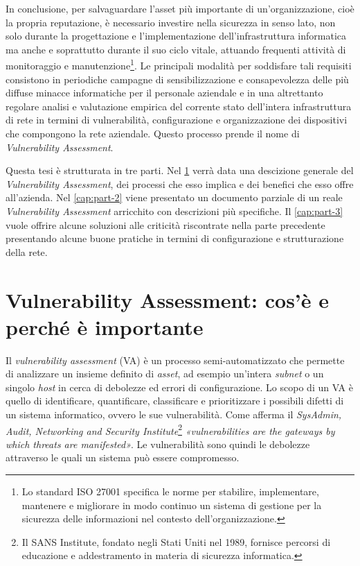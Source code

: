 \documentclass[target=bach,aauheader=]{thud}
\begin{document}
In conclusione, per salvaguardare l’asset più importante di un’organizzazione, cioè la propria reputazione, è necessario investire nella sicurezza in senso lato, non solo durante la progettazione e l’implementazione dell’infrastruttura informatica ma anche e soprattutto durante il suo ciclo vitale, attuando frequenti attività di monitoraggio e manutenzione\footnote{Lo standard ISO 27001 specifica le norme per stabilire, implementare, mantenere e migliorare in modo continuo un sistema di gestione per la sicurezza delle informazioni nel contesto dell’organizzazione.}. Le principali modalità per soddisfare tali requisiti consistono in periodiche campagne di sensibilizzazione e consapevolezza delle più diffuse minacce informatiche per il personale aziendale e in una altrettanto regolare analisi e valutazione empirica del corrente stato dell’intera infrastruttura di rete in termini di vulnerabilità, configurazione e organizzazione dei dispositivi che compongono la rete aziendale.
Questo processo prende il nome di \textit{Vulnerability Assessment}.

Questa tesi è strutturata in tre parti. Nel \cref{cap:part-1} verrà data una descizione generale del \textit{Vulnerability Assessment}, dei processi che esso implica e dei benefici che esso offre all'azienda. Nel \cref{cap:part-2} viene presentato un documento parziale di un reale \textit{Vulnerability Assessment} arricchito con descrizioni più specifiche. Il \cref{cap:part-3} vuole offrire alcune soluzioni alle criticità riscontrate nella parte precedente presentando alcune buone pratiche in termini di configurazione e strutturazione della rete.


\chapter{Vulnerability Assessment: cos’è e perché è importante} \label{cap:part-1}

Il \textit{vulnerability assessment} (VA) è un processo semi-automatizzato che permette di analizzare un insieme definito di \textit{asset}, ad esempio un’intera \textit{subnet} o un singolo \textit{host} in cerca di debolezze ed errori di configurazione. Lo scopo di un VA è quello di identificare, quantificare, classificare e prioritizzare i possibili difetti di un sistema informatico, ovvero le sue vulnerabilità. Come afferma il \textit{SysAdmin, Audit, Networking and Security Institute}\footnote{Il SANS Institute, fondato negli Stati Uniti nel 1989, fornisce percorsi di educazione e addestramento in materia di sicurezza informatica.} \textit{«vulnerabilities are the gateways by which threats are manifested»}. Le vulnerabilità sono quindi le debolezze attraverso le quali un sistema può essere compromesso.
\end{document}
